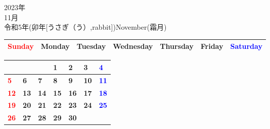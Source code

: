 \documentclass[a4paper,landscape]{jsarticle}
\newcommand{\dig}{\hspace{29mm}}
\newcommand{\tdig}{\hspace{27mm}}
\newcommand{\LBF}{\LARGE\textbf}
\begin{document}
\newpage

\begin{center}
	\HUGE 2023年\\
	\huge 11月\\
	\large 令和5年(卯年[うさぎ（う）,rabbit])November(霜月)
\end{center}

\begingroup
\renewcommand{\arraystretch}{1.4}
\begin{tabular}{|>{\centering\arraybackslash}p{32mm}|>{\centering\arraybackslash}p{32mm}|>{\centering\arraybackslash}p{32mm}|>{\centering\arraybackslash}p{32mm}|>{\centering\arraybackslash}p{32mm}|>{\centering\arraybackslash}p{32mm}|>{\centering\arraybackslash}p{32mm}|}
\hline
\textcolor{red}{\large Sunday}&\large Monday&\large Tuesday&\large Wednesday&\large Thursday&\large Friday&\textcolor{blue}{\large Saturday}\\
\hline
\end{tabular}
\endgroup

\begingroup
\renewcommand{\arraystretch}{4}
\begin{tabular}{|p{32mm}|p{32mm}|p{32mm}|p{32mm}|p{32mm}|p{32mm}|p{32mm}|}
\hline
&&&\raisebox{30pt} {\dig\LBF{1}}&\raisebox{30pt} {\dig\LBF{2}}&\raisebox{30pt} {\dig\LBF{3}}&\raisebox{30pt} {\dig\textcolor{blue}{\LBF{4}}}\\
\hline
\raisebox{30pt} {\dig\textcolor{red}{\LBF{5}}}&\raisebox{30pt} {\dig\LBF{6}}&\raisebox{30pt} {\dig\LBF{7}}&\raisebox{30pt} {\dig\LBF{8}}&\raisebox{30pt} {\dig\LBF{9}}&\raisebox{30pt} {\tdig\LBF{10}}&\raisebox{30pt} {\tdig\textcolor{blue}{\LBF{11}}}\\
\hline
\raisebox{30pt} {\tdig\textcolor{red}{\LBF{12}}}&\raisebox{30pt} {\tdig\LBF{13}}&\raisebox{30pt} {\tdig\LBF{14}}&\raisebox{30pt} {\tdig\LBF{15}}&\raisebox{30pt} {\tdig\LBF{16}}&\raisebox{30pt} {\tdig\LBF{17}}&\raisebox{30pt} {\tdig\textcolor{blue}{\LBF{18}}}\\
\hline
\raisebox{30pt} {\tdig\textcolor{red}{\LBF{19}}}&\raisebox{30pt} {\tdig\LBF{20}}&\raisebox{30pt} {\tdig\LBF{21}}&\raisebox{30pt} {\tdig\LBF{22}}&\raisebox{30pt} {\tdig\LBF{23}}&\raisebox{30pt} {\tdig\LBF{24}}&\raisebox{30pt} {\tdig\textcolor{blue}{\LBF{25}}}\\
\hline
\raisebox{30pt} {\tdig\textcolor{red}{\LBF{26}}}&\raisebox{30pt} {\tdig\LBF{27}}&\raisebox{30pt} {\tdig\LBF{28}}&\raisebox{30pt} {\tdig\LBF{29}}&\raisebox{30pt} {\tdig\LBF{30}}&&\\
\hline
\end{tabular}
\endgroup
\end{document}
